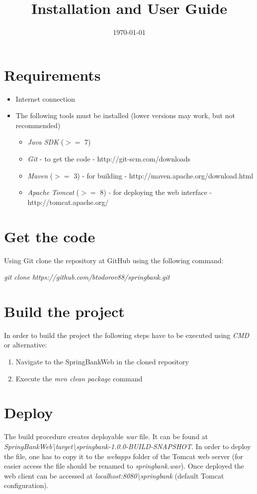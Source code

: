 \documentclass[a4paper, notitlepage]{article}
\begin{document}
\title{Installation and User Guide} 
\date{\today}
\maketitle



\section{Requirements}

\begin{itemize}
	\item Internet connection
	\item The following tools must be installed (lower versions may work, but not recommended)
	\begin{itemize}
		\item \textit{Java SDK} ($>=$ 7)
		\item \textit{Git} - to get the code - http://git-scm.com/downloads
		\item \textit{Maven} ($>=$ 3) - for building - http://maven.apache.org/download.html
		\item \textit{Apache Tomcat} ($>=$ 8) - for deploying the web interface - http://tomcat.apache.org/
	\end{itemize}
\end{itemize}

\section{Get the code}
Using Git clone the repository at GitHub using the following command:

\textit{git clone https://github.com/btodorov88/springbank.git}

\section{Build the project}

In order to build the project the following steps have to be executed using \textit{CMD} or alternative:
\begin{enumerate}
	\item Navigate to the SpringBankWeb in the cloned repository
	\item Execute the \textit{mvn clean package} command
\end{enumerate}

\section{Deploy}
The build procedure creates deployable \textit{war} file. It can be found at \textit{SpringBankWeb\textbackslash target\textbackslash springbank-1.0.0-BUILD-SNAPSHOT}. In order to deploy the file, one has to copy it to the \textit{webapps} folder of the Tomcat web server (for easier access the file should be renamed to \textit{springbank.war}). Once deployed the web client can be accessed at \textit{localhost:8080\textbackslash springbank} (default Tomcat configuration).
\end{document}
